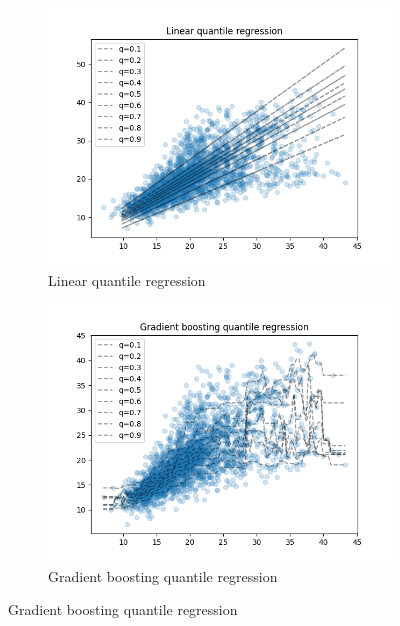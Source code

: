 \begin{figure}[!h]
    \begin{subfigure}[b]{0.5\linewidth}
      \centering
      \includegraphics[width=1.1\textwidth]{images/melbourne_linear_quantile_regression.png} 
      \caption{Linear quantile regression} 
      \label{fig:melbourne_linear_quantile_regression} 
      \vspace{4ex}
    \end{subfigure}%
    \begin{subfigure}[b]{0.5\linewidth}
      \centering
      \includegraphics[width=1.1\textwidth]{images/melbourne_gradient_boosting_quantile_regression.png} 
      \caption{Gradient boosting quantile regression} 
      \label{fig:melbourne_gradient_boosting_quantile_regression} 

\end{subfigure}
\end{figure}

